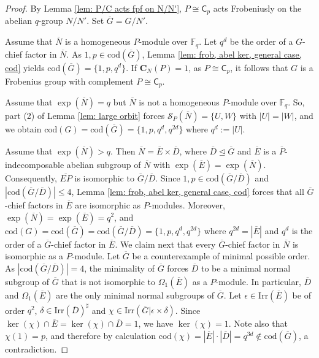 \documentclass[9pt]{article}
\begin{document}
\begin{proof}
	By Lemma \ref{lem: P/C acts fpf on N/N'},
	$P\cong \mathsf{C}_{p}$ acts Frobeniusly on the abelian $q$-group
    $N/N'$.
	Set $\overline{G}=G/N'$.


	 Assume that $\overline{N}$ is a homogeneous $P$-module over $\mathbb{F}_q$.
	 Let $q^{d}$ be the order of a $G$-chief factor in $\overline{N}$.
	 As $1,p\in \mathrm{cod}(\overline{G})$, 
	 Lemma \ref{lem: frob, abel ker, general case, cod}
	 yields $\mathrm{cod}(\overline{G})=\{ 1,p,q^{d} \}$.
	 If $\mathbf{C}_{N}(P)=1$, as $P\cong \mathsf{C}_{p}$, it follows that
	 $G$ is a Frobenius group with complement $P\cong \mathsf{C}_{p}$.
	

	 Assume that $\exp(\overline{N})=q$ but $\overline{N}$ is not a homogeneous $P$-module over $\mathbb{F}_q$.
	 So, part (2) of Lemma \ref{lem: large orbit} forces
	 $\mathcal{S}_{P}(\overline{N})=\{ U,W \}$ with $|U|=|W|$,
	 and we obtain 
	 $\mathrm{cod}(G)=\mathrm{cod}(\overline{G})=\{ 1,p,q^{d},q^{2d} \}$ where $q^{d}:=|U|$.


  

	 Assume that $\exp(\overline{N})>q$.
     Then $\overline{N}=\overline{E}\times \overline{D}$,
	 where $\overline{D}\unlhd\overline{G}$
	 and $\overline{E}$ is a $\overline{P}$-indecomposable abelian subgroup of $\overline{N}$
	 with $\exp(\overline{E})=\exp(\overline{N})$.
	 Consequently, $\overline{EP}$ is isomorphic to $\overline{G}/\overline{D}$. 
	 Since $1,p\in \mathrm{cod}(\overline{G}/\overline{D})$ and $|\mathrm{cod}(\overline{G}/\overline{D})|\leq 4$,
	 Lemma \ref{lem: frob, abel ker, general case, cod} forces that
     all $\overline{G}$-chief factors in $\overline{E}$
	 are isomorphic as $P$-modules.
	 Moreover, $\exp(\overline{N})=\exp(\overline{E})=q^{2}$,
	 and $\mathrm{cod}(G)=\mathrm{cod}(\overline{G})=\mathrm{cod}(\overline{G}/\overline{D})=\{ 1,p,q^{d},q^{2d}\}$ where $q^{2d}=|\overline{E}|$ and $q^{d}$ is the order of a $\overline{G}$-chief factor in $\overline{E}$.
	 We claim next that every $\overline{G}$-chief factor in $\overline{N}$ is isomorphic as a $P$-module.
	  Let $\overline{G}$ be a counterexample of minimal possible order.
	  As $|\mathrm{cod}(\overline{G}/\overline{D})|=4$, the minimality of $\overline{G}$ forces $\overline{D}$ 
	  to be a minimal normal subgroup of $\overline{G}$ that is not isomorphic to $\Omega_1(\overline{E})$ as a $P$-module.
	  In particular, $\overline{D}$ and $\Omega_1(\overline{E})$ are the only minimal normal subgroups of $\overline{G}$.
	  Let $\epsilon\in \mathrm{Irr}(\overline{E})$ be of order $q^{2}$, $\delta \in \mathrm{Irr}(\overline{D})^\sharp$ and $\chi\in \mathrm{Irr}(\overline{G}|\epsilon\times \delta)$.
	  Since $\ker(\chi)\cap \overline{E}=\ker(\chi)\cap \overline{D}=1$,
	  we have $\ker(\chi)=1$.
	  Note also that $\chi(1)=p$, and therefore by calculation $\mathrm{cod}(\chi)=|\overline{E}|\cdot |\overline{D}|=q^{3d}\notin \mathrm{cod}(\overline{G})$, a contradiction.



\end{proof}
\end{document}
